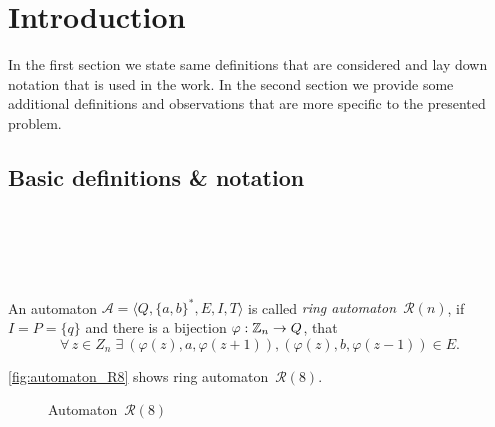 \chapter{Introduction}

In the first section we state same definitions that are considered and lay down notation that is used in the work. In the second section we provide some additional definitions and observations that are more specific to the presented problem.

\section{Basic definitions \& notation}

\begin{defn} \\
    \\
    \\
\end{defn}

\section{}

\begin{defn}
    An automaton $\mathcal{A} = \langle Q, {\{a,b\}}^*, E, I, T \rangle$ is called \emph{ring automaton~${\mathcal{R}(n)}$}, if $I = P = \{q\}$ and there is a bijection $\varphi: \mathbb{Z}_n \to Q$, that
    \[
        \forall \, z \in Z_n \; \exists \: (\varphi(z),a,\varphi(z+1)), (\varphi(z),b,\varphi(z-1)) \in E.
    \]
\end{defn}

\begin{example}
    \autoref*{fig:automaton_R8} shows ring automaton~${\mathcal{R}(8)}$.
\end{example}

\begin{figure}[h]
    \centering
    
    \caption{Automaton~${\mathcal{R}(8)}$}\label{fig:automaton_R8}
\end{figure}
